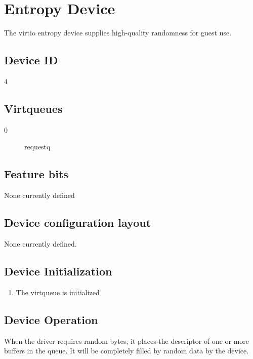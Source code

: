 \section{Entropy Device}\label{sec:Device Types / Entropy Device}

The virtio entropy device supplies high-quality randomness for
guest use.

\subsection{Device ID}\label{sec:Device Types / Entropy Device / Device ID}
  4

\subsection{Virtqueues}\label{sec:Device Types / Entropy Device / Virtqueues}
\begin{description}
\item[0] requestq
\end{description}

\subsection{Feature bits}\label{sec:Device Types / Entropy Device / Feature bits}
  None currently defined

\subsection{Device configuration layout}\label{sec:Device Types / Entropy Device / Device configuration layout}
  None currently defined.

\subsection{Device Initialization}\label{sec:Device Types / Entropy Device / Device Initialization}

\begin{enumerate}
\item The virtqueue is initialized
\end{enumerate}

\subsection{Device Operation}\label{sec:Device Types / Entropy Device / Device Operation}

When the driver requires random bytes, it places the descriptor
of one or more buffers in the queue. It will be completely filled
by random data by the device.

